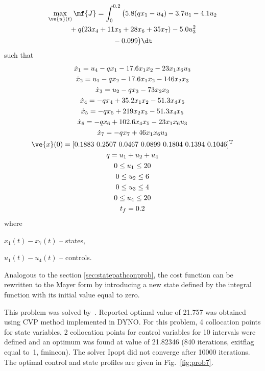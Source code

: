 \begin{gather}
\max_{\ve{u}(t)} \mf{J} =
\int_{0}^{0.2}\big(5.8(qx_{1}-u_{4})-3.7u_{1}-4.1u_{2}\nonumber\\ %
\mbox{}+q(23x_{4}+11x_{5}+28x_{6}+35x_{7})-5.0u_{3}^{2}\nonumber\\
\mbox{}-0.099\big)\dt \label{eq:cstr}
\end{gather}
such that
\begin{gather*}
\dot{x}_1  =  u_{4}-qx_{1}-17.6x_{1}x_{2}-23x_{1}x_{6}u_{3}\\
\dot{x}_2  =  u_{1}-qx_{2}-17.6x_{1}x_{2}-146x_{2}x_{3}\\
\dot{x}_3  =  u_{2}-qx_{3}-73x_{2}x_{3}\\
\dot{x}_4  =  -qx_{4}+35.2x_{1}x_{2}-51.3x_{4}x_{5}\\
\dot{x}_5  =  -qx_{5}+219x_{2}x_{3}-51.3x_{4}x_{5}\\
\dot{x}_6  =  -qx_{6}+102.6x_{4}x_{5}-23x_{1}x_{6}u_{3}\\
\dot{x}_7  =  -qx_{7}+46x_{1}x_{6}u_{3}\\
\ve{x}(0) = [0.1883~0.2507~0.0467~0.0899~0.1804~0.1394~0.1046]^{\textrm{T}}\\
q = u_{1}+u_{2}+u_{4}\\
0 \leq u_{1} \leq 20\\
0 \leq u_{2} \leq 6\\
0 \leq u_{3} \leq 4\\
0 \leq u_{4} \leq 20\\
t_{f}=0.2
\end{gather*}
where 
\begin{description}
\item $x_{1}(t) - x_{7}(t)$ -- states,
\item $u_{1}(t) - u_{4}(t)$ -- controls.
\end{description}
Analogous to the section \ref{sec:statepathconprob}, the cost function
can be rewritten to the Mayer form by introducing a new state defined
by the integral function with its initial value equal to zero.

This problem was solved by~\cite{fik02,jac69}. Reported optimal value
of 21.757 was obtained using CVP method implemented in DYNO. For this
problem, 4 collocation points for state variables, 2 collocation
points for control variables for 10 intervals were defined and an
optimum was found at value of 21.82346 (840 iterations, exitflag equal
to~1, fmincon). The solver Ipopt did not converge after 10000
iterations. The optimal control and state profiles are given in
Fig.~\ref{fig:prob7}.

